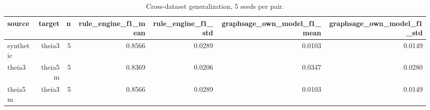 \begin{table}[htbp]
\centering
\caption{Cross-dataset generalization, 5 seeds per pair.}
\label{tab:generalization}
\begin{tabular}{lrrrrrr}
\hline
source & target & n & rule_engine_f1_mean & rule_engine_f1_std & graphsage_own_model_f1_mean & graphsage_own_model_f1_std \\
\hline
synthetic & theia3 & 5 & 0.8566 & 0.0289 & 0.0103 & 0.0149 \\
theia3 & theia5m & 5 & 0.8369 & 0.0206 & 0.0347 & 0.0280 \\
theia5m & theia3 & 5 & 0.8566 & 0.0289 & 0.0103 & 0.0149 \\
\hline
\end{tabular}
\end{table}
